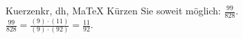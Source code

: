 \begin{MAufgabe}{Kuerzen}{kr, dh, MaTeX}
K\"urzen Sie soweit m\"oglich: $\frac{99}{828}$.\\ 
\ifLsg\MLoesung
\quad $\frac{99}{828}=\frac{(9)\cdot(11)}{(9)\cdot(92)}=\frac{11}{92}$.\else\relax\fi
 \end{MAufgabe}